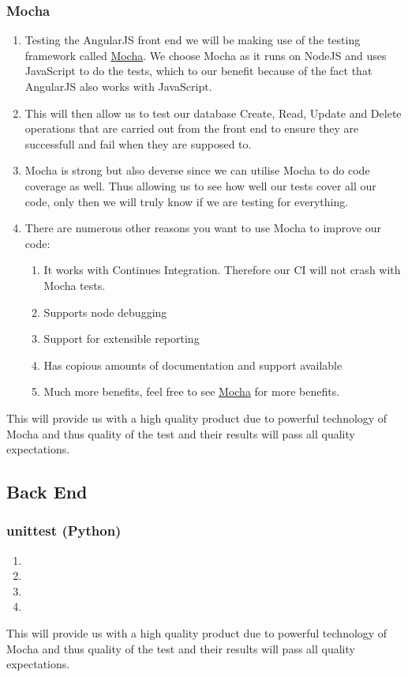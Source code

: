 \documentclass{article}
\begin{document}
		\subsubsection{Mocha}
			\begin{enumerate}
				\item Testing the AngularJS front end we will be making use of the testing framework called \href{http://mochajs.org/}{Mocha}. We choose Mocha as it runs on NodeJS and uses JavaScript to do the tests, which to our benefit because of the fact that AngularJS also works with JavaScript.
				\item This will then allow us to test our database Create, Read, Update and Delete operations that are carried out from the front end to ensure they are successfull and fail when they are supposed to.
				\item Mocha is strong but also deverse since we can utilise Mocha to do code coverage as well. Thus allowing us to see how well our tests cover all our code, only then we will truly know if we are testing for everything.
				\item There are numerous other reasons you want to use Mocha to improve our code:
					\begin{enumerate}
						\item It works with Continues Integration. Therefore our CI will not crash with Mocha tests.
						\item Supports node debugging 
						\item Support for extensible reporting 
						\item Has copious amounts of documentation and support available
						\item Much more benefits, feel free to see \href{http://mochajs.org/}{Mocha} for more benefits.
					\end{enumerate} 
			\end{enumerate}
			\noindent
			This will provide us with a high quality product due to powerful technology of Mocha and thus quality of the test and their results will pass all quality expectations.
	\subsection{Back End}
		\subsubsection{unittest (Python)}
			\begin{enumerate}
				\item 
				\item 
				\item 
				\item 
			\end{enumerate}
			\noindent
			This will provide us with a high quality product due to powerful technology of Mocha and thus quality of the test and their results will pass all quality expectations.
\end{document}
